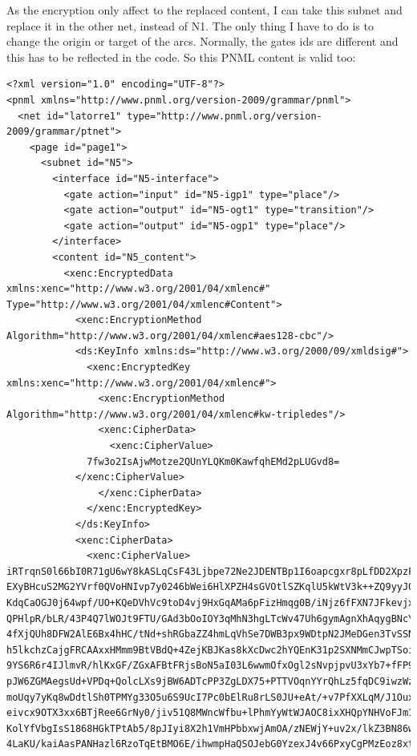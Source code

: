 As the encryption only affect to the replaced content, I can take this subnet
and replace it in the other net, instead of N1. The only thing I have to
do is to change the origin or target of the arcs. Normally, the gates ids are different and this has to be reflected in the code. So this PNML content is valid
too:

\begin{lstlisting}
<?xml version="1.0" encoding="UTF-8"?>
<pnml xmlns="http://www.pnml.org/version-2009/grammar/pnml">
  <net id="latorre1" type="http://www.pnml.org/version-2009/grammar/ptnet">
    <page id="page1">
      <subnet id="N5">
        <interface id="N5-interface">
          <gate action="input" id="N5-igp1" type="place"/>
          <gate action="output" id="N5-ogt1" type="transition"/>
          <gate action="output" id="N5-ogp1" type="place"/>
        </interface>
        <content id="N5_content">
          <xenc:EncryptedData xmlns:xenc="http://www.w3.org/2001/04/xmlenc#" Type="http://www.w3.org/2001/04/xmlenc#Content">
            <xenc:EncryptionMethod Algorithm="http://www.w3.org/2001/04/xmlenc#aes128-cbc"/>
            <ds:KeyInfo xmlns:ds="http://www.w3.org/2000/09/xmldsig#">
              <xenc:EncryptedKey xmlns:xenc="http://www.w3.org/2001/04/xmlenc#">
                <xenc:EncryptionMethod Algorithm="http://www.w3.org/2001/04/xmlenc#kw-tripledes"/>
                <xenc:CipherData>
                  <xenc:CipherValue>
              7fw3o2IsAjwMotze2QUnYLQKm0KawfqhEMd2pLUGvd8=
            </xenc:CipherValue>
                </xenc:CipherData>
              </xenc:EncryptedKey>
            </ds:KeyInfo>
            <xenc:CipherData>
              <xenc:CipherValue>
iRTrqnS0l66bI0R71gU6wY8kASLqCsF43Ljbpe72Ne2JDENTBp1I6oapcgxr8pLfDD2XpzFKV9cE
EXyBHcuS2MG2YVrf0QVoHNIvp7y0246bWei6HlXPZH4sGVOtlSZKqlU5kWtV3k++ZQ9yyJ0F7pG1
KdqCaOGJ0j64wpf/UO+KQeDVhVc9toD4vj9HxGqAMa6pFizHmqg0B/iNjz6fFXN7JFkevjx6a/e8
QPHlpR/bLR/43P4Q7lWOJt9FTU/GAd3bOoIOY3qMhN3hgLTcWv47Uh6gymAgnXhAqygBNcYyHS79
4fXjQUh8DFW2AlE6Bx4hHC/tNd+shRGbaZZ4hmLqVhSe7DWB3px9WDtpN2JMeDGen3TvSSNPjAnk
h5lkchzCajgFRCAAxxHMmm9BtVBdQ+4ZejKBJKas8kXcDwc2hYQEnK31p2SXNMmCJwpTSoiNIR7s
9YS6R6r4IJlmvR/hlKxGF/ZGxAFBtFRjsBoN5aI03L6wwmOfxOgl2sNvpjpvU3xYb7+fFP9s1eJ5
pJW6ZGMAegsUd+VPDq+QolcLXs9jBW6ADTcPP3ZgLDX75+PTTVOqnYYrQhLz5fqDC9iwzWzI68bc
moUqy7yKq8wDdtlSh0TPMYg33O5u6S9UcI7Pc0bElRu8rLS0JU+eAt/+v7PfXXLqM/J1Oux9MGcJ
eivcx9OTX3xx6BTjRee6GrNy0/jiv51Q8MWncWfbu+lPhmYyWtWJAOC8ixXHQpYNHVoFJm1QOOaA
KolYfVbgIsS1868HGkTPtAb5/8pJIyi8X2h1VmHPbbxwjAmOA/zNEWjY+uv2x/lkZ3BN86wcsvW2
4LaKU/kaiAasPANHazl6RzoTqEtBMO6E/ihwmpHaQSOJebG0YzexJ4v66PxyCgPMzEoz8xtwQeQs

\end{lstlisting}
